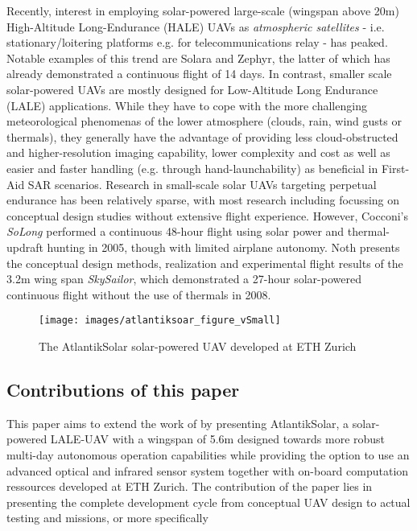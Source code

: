 Recently, interest in employing solar-powered large-scale (wingspan above 20m) High-Altitude Long-Endurance (HALE) UAVs as \textit{atmospheric satellites} - i.e. stationary/loitering platforms e.g. for telecommunications relay - has peaked. Notable examples of this trend are Solara \cite{IEEE_AtmosphericSatellites} and Zephyr, the latter of which has already demonstrated a continuous flight of 14 days\cite{QinetiQ_Zephyr14dayRecord}. In contrast, smaller scale solar-powered UAVs are mostly designed for Low-Altitude Long Endurance (LALE) applications. While they have to cope with the more challenging meteorological phenomenas of the lower atmosphere (clouds, rain, wind gusts or thermals), they generally have the advantage of providing less cloud-obstructed and higher-resolution imaging capability, lower complexity and cost as well as easier and faster handling (e.g. through hand-launchability) as beneficial in First-Aid SAR scenarios. Research in small-scale solar UAVs targeting perpetual endurance has been relatively sparse, with most research including \cite{Morton_ICRA2013} focussing on conceptual design studies without extensive flight experience. However, Cocconi's \textit{SoLong} \cite{Cocconi_SoLong} performed a continuous 48-hour flight using solar power and thermal-updraft hunting in 2005, though with limited airplane autonomy. Noth\cite{Noth_PhD} presents the conceptual design methods, realization and experimental flight results of the 3.2m wing span \textit{SkySailor}, which demonstrated a 27-hour solar-powered continuous flight without the use of thermals in 2008. 
\begin{figure}[b]
    \centering
    \texttt{[image: images/atlantiksoar\_figure\_vSmall]}
    \caption{The AtlantikSolar solar-powered UAV developed at ETH Zurich}
    \label{fig:AtlantikSolarCollage}
\end{figure}

\subsection{Contributions of this paper}

This paper aims to extend the work of \cite{Cocconi_SoLong,Noth_PhD} by presenting AtlantikSolar, a solar-powered LALE-UAV with a wingspan of 5.6m designed towards more robust multi-day autonomous operation capabilities while providing the option to use an advanced optical and infrared sensor system together with on-board computation ressources developed at ETH Zurich. The contribution of the paper lies in presenting the complete development cycle from conceptual UAV design to actual testing and missions, or more specifically
  
